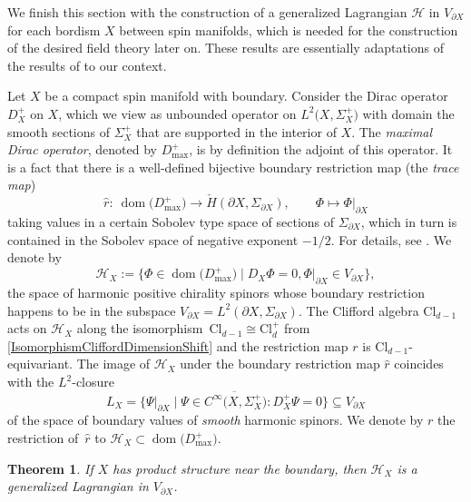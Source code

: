 \documentclass[pdftex]{sigma}
\numberwithin{equation}{section}
\newtheorem{Theorem}{Theorem}[section]
\DeclareMathOperator{\dom}{\mathrm{dom}}
\newcommand{\Cl}{\mathrm{Cl}}
\begin{document}
We finish this section with the construction of a generalized Lagrangian $\mathcal{H}$ in $V_{\partial X}$ for each bordism $X$ between spin manifolds, which is needed for the construction of the desired field theory later on.
These results are essentially adaptations of the results of \cite[Section~3]{LudewigRoos} to our context.



Let $X$ be a compact spin manifold with boundary.
Consider the Dirac operator $D_X^+$ on $X$, which we view as unbounded operator on $L^2\big(X, \Sigma_X^+\big)$ with domain the smooth sections of $\Sigma_X^+$ that are supported in the interior of $X$.
The \emph{maximal Dirac operator}, denoted by $D_{\max}^+$, is by definition the adjoint of this operator.
It is a fact that there is a well-defined bijective boundary restriction map (the \emph{trace map})
\begin{equation*}
 \hat{r}\colon\ \dom\big(D_{\max}^+\big) \longrightarrow \check H(\partial X, \Sigma_{\partial X}), \qquad \Phi \longmapsto \Phi|_{\partial X}
\end{equation*}
taking values in a certain Sobolev type space of sections of $\Sigma_{\partial X}$, which in turn is contained in the Sobolev space of negative exponent $-1/2$.
For details, see \cite{BaerBallmannGuide}.
We denote by
\begin{equation*}
 \mathcal{H}_X := \big\{ \Phi \in \dom\big(D_{\max}^+\big) \mid D_X \Phi = 0, \Phi|_{\partial X} \in V_{\partial X}\big\},
\end{equation*}
the space of harmonic positive chirality spinors whose boundary restriction happens to be in the subspace $V_{\partial X} = L^2(\partial X, \Sigma_{\partial X})$.
The Clifford algebra $\Cl_{d-1}$ acts on $\mathcal{H}_X$ along the isomorphism~${\Cl_{d-1} \cong \Cl_d^+}$ from \eqref{IsomorphismCliffordDimensionShift} and the restriction map $r$ is $\Cl_{d-1}$-equivariant.
The image of $\mathcal{H}_X$ under the boundary restriction map $\hat{r}$ coincides with the $L^2$-closure
\begin{equation*}%
 L_X = \overline{\big\{ \Psi|_{\partial X} \mid \Psi \in C^\infty\big(X, \Sigma_X^+\big) \colon D_X^+ \Psi = 0\big\}} \subseteq V_{\partial X}
\end{equation*}
of the space of boundary values of \emph{smooth} harmonic spinors.
We denote by $r$ the restriction of~$\hat{r}$ to $\mathcal{H}_X \subset \dom\big(D_{\max}^+\big)$.


\begin{Theorem} \label{ThmLXLagrangian}
If $X$ has product structure near the boundary, then $\mathcal{H}_X$ is a generalized Lagrangian in $V_{\partial X}$.
\end{Theorem}
\end{document}
